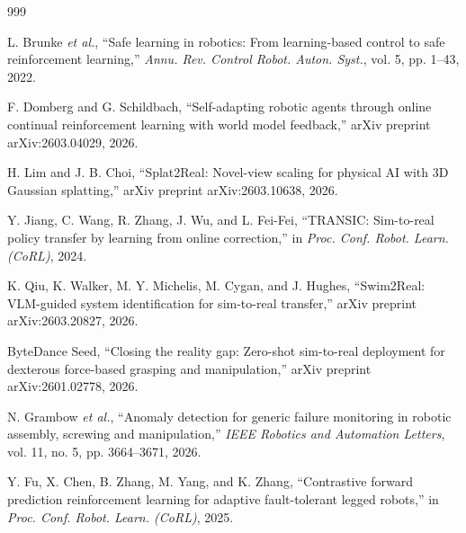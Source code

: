 \documentclass[12pt,a4paper,oneside]{report}
\begin{document}
\begin{thebibliography}{999}

L. Brunke \textit{et al.}, ``Safe learning in robotics: From learning-based control to safe reinforcement learning,'' \textit{Annu. Rev. Control Robot. Auton. Syst.}, vol. 5, pp. 1--43, 2022.




F. Domberg and G. Schildbach, ``Self-adapting robotic agents through online continual reinforcement learning with world model feedback,'' arXiv preprint arXiv:2603.04029, 2026.




H. Lim and J. B. Choi, ``Splat2Real: Novel-view scaling for physical {AI} with {3D} Gaussian splatting,'' arXiv preprint arXiv:2603.10638, 2026.




Y. Jiang, C. Wang, R. Zhang, J. Wu, and L. Fei-Fei, ``{TRANSIC}: Sim-to-real policy transfer by learning from online correction,'' in \textit{Proc. Conf. Robot. Learn. (CoRL)}, 2024.




K. Qiu, K. Walker, M. Y. Michelis, M. Cygan, and J. Hughes, ``Swim2Real: VLM-guided system identification for sim-to-real transfer,'' arXiv preprint arXiv:2603.20827, 2026.




ByteDance Seed, ``Closing the reality gap: Zero-shot sim-to-real deployment for dexterous force-based grasping and manipulation,'' arXiv preprint arXiv:2601.02778, 2026.





N. Grambow \textit{et al.}, ``Anomaly detection for generic failure monitoring in robotic assembly, screwing and manipulation,'' \textit{IEEE Robotics and Automation Letters}, vol. 11, no. 5, pp. 3664--3671, 2026.




Y. Fu, X. Chen, B. Zhang, M. Yang, and K. Zhang, ``Contrastive forward prediction reinforcement learning for adaptive fault-tolerant legged robots,'' in \textit{Proc. Conf. Robot. Learn. (CoRL)}, 2025.




\end{thebibliography}
\end{document}
